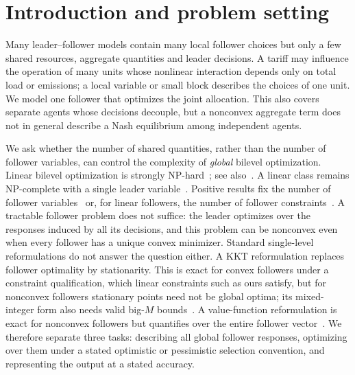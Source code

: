 \section{Introduction and problem setting}\label{sec:foundations}

Many leader--follower models contain many local follower choices but only
a few shared resources, aggregate quantities and leader decisions. A tariff
may influence the operation of many units whose nonlinear interaction
depends only on total load or emissions; a local variable or small block
describes the choices of one unit. We model one follower that
optimizes the joint allocation. This also covers separate agents whose
decisions decouple, but a nonconvex aggregate term does not in general
describe a Nash equilibrium among independent agents.

We ask whether the number of shared quantities, rather than the number of
follower variables, can control the complexity of \emph{global} bilevel
optimization. Linear bilevel optimization is strongly
NP-hard~\cite{HansenJaumardSavard1992}; see also~\cite{Buchheim2023,KetkovProkopyev2026}.
A linear class remains NP-complete with a single leader
variable~\cite{SugishitaCarvalhoIPCO2026,SugishitaCarvalho2026}. Positive
results fix the number of follower
variables~\cite{LiuSpencer1995,Deng1998,KetkovProkopyev2026} or, for linear
followers, the number of follower constraints~\cite{KetkovProkopyev2026}. A tractable follower
problem does not suffice: the leader optimizes over the responses induced
by all its decisions, and this problem can be nonconvex even when every
follower has a unique convex minimizer. Standard single-level
reformulations do not answer the question either. A KKT reformulation
replaces follower optimality by stationarity. This is exact for convex
followers under a constraint qualification, which linear constraints such
as ours satisfy, but for nonconvex followers stationary points need not be
global optima; its mixed-integer form also needs valid big-$M$
bounds~\cite{KleinertEtAl2021,Buchheim2023}.
A value-function reformulation is exact for nonconvex followers but
quantifies over the entire follower vector~\cite{JeyakumarEtAl2016,NieWangYe2017}.
We therefore separate three tasks: describing all global follower
responses, optimizing over them under a stated optimistic or pessimistic
selection convention, and representing the output at a stated accuracy.

